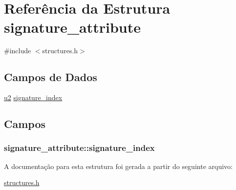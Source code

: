 \hypertarget{structsignature__attribute}{}\section{Referência da Estrutura signature\+\_\+attribute}
\label{structsignature__attribute}


{\ttfamily \#include $<$structures.\+h$>$}

\subsection*{Campos de Dados}
\begin{DoxyCompactItemize}
\item 
\hyperlink{lista__operandos_8h_a732cde1300aafb73b0ea6c2558a7a54f}{u2} \hyperlink{structsignature__attribute_a63a67e73289180add457fbc0ae36413f}{signature\+\_\+index}
\end{DoxyCompactItemize}


\subsection{Campos}
\subsubsection[{\texorpdfstring{signature\+\_\+index}{signature_index}}]{ signature\+\_\+attribute\+::signature\+\_\+index}\hypertarget{structsignature__attribute_a63a67e73289180add457fbc0ae36413f}{}\label{structsignature__attribute_a63a67e73289180add457fbc0ae36413f}


A documentação para esta estrutura foi gerada a partir do seguinte arquivo\+:\begin{DoxyCompactItemize}
\item 
\hyperlink{structures_8h}{structures.\+h}\end{DoxyCompactItemize}
